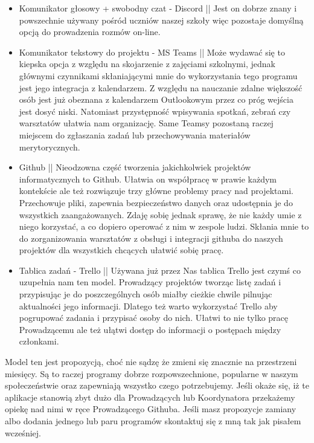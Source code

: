 \documentclass[9pt,a4paper]{report}
\begin{document}
\begin{itemize}
\item Komunikator głosowy + swobodny czat - Discord ||
Jest on dobrze znany i powszechnie używany pośród uczniów naszej szkoły więc pozostaje domyślną opcją do prowadzenia rozmów on-line.
\item Komunikator tekstowy do projektu - MS Teams ||
Może wydawać się to kiepska opcja z względu na skojarzenie z zajęciami szkolnymi, jednak głównymi czynnikami skłaniającymi mnie do wykorzystania tego programu jest jego integracja z kalendarzem. Z względu na nauczanie zdalne większość osób jest już obeznana z kalendarzem Outlookowym przez co próg wejścia jest dosyć niski. Natomiast przystępność wpisywania spotkań, zebrań czy warsztatów ułatwia nam organizację. Same Teamsy pozostaną raczej miejscem do zgłaszania zadań lub przechowywania materiałów merytorycznych.
\item Github ||
Nieodzowna część tworzenia jakichkolwiek projektów informatycznych to Github. Ułatwia on współpracę w prawie każdym kontekście ale też rozwiązuje trzy główne problemy pracy nad projektami. Przechowuje pliki, zapewnia bezpieczeństwo danych oraz udostępnia je do wszystkich zaangażowanych. Zdaję sobię jednak sprawę, że nie każdy umie z niego korzystać, a co dopiero operować z nim w zespole ludzi. Skłania mnie to do zorganizowania warsztatów z obsługi i integracji githuba do naszych projektów dla wszystkich chcących ułatwić sobię pracę.
\item Tablica zadań - Trello ||
Używana już przez Nas tablica Trello jest czymś co uzupełnia nam ten model. Prowadzący projektów tworząc listę zadań i przypisując je do poszczególnych osób miałby cieżkie chwile pilnując aktualności jego informacji. Dlatego też warto wykorzystać Trello aby pogrupować zadania i przypisać osoby do nich. Ułatwi to nie tylko pracę Prowadzącemu ale też ułątwi dostęp do informacji o postępach między członkami.
\end{itemize}

Model ten jest propozycją, choć nie sądzę że zmieni się znacznie na przestrzeni miesięcy. Są to raczej programy dobrze rozpowszechnione, popularne w naszym społeczeństwie oraz zapewniają wszystko czego potrzebujemy. Jeśli okaże się, iż te aplikacje stanowią zbyt dużo dla Prowadzących lub Koordynatora przekażemy opiekę nad nimi w ręce Prowadzącego Githuba. Jeśli masz propozycje zamiany albo dodania jednego lub paru programów skontaktuj się z mną tak jak pisałem wcześniej.
\end{document}
